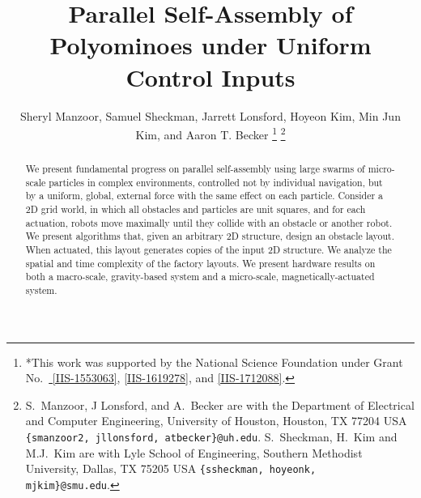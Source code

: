 \documentclass[letterpaper, 10 pt, conference]{ieeeconf}
\begin{document}
\title{\LARGE \bf 
Parallel Self-Assembly of Polyominoes under Uniform Control Inputs 
}
\author{Sheryl Manzoor, Samuel Sheckman, Jarrett Lonsford, Hoyeon Kim, Min Jun Kim, and Aaron T. Becker%
\thanks{*This work was supported by the National Science Foundation under Grant No.\ \href{http://nsf.gov/awardsearch/showAward?AWD_ID=1553063}{ [IIS-1553063]}, \href{http://nsf.gov/awardsearch/showAward?AWD_ID=1619278}{[IIS-1619278]}, and \href{https://nsf.gov/awardsearch/showAward?AWD_ID=1712088}{[IIS-1712088]}.}%
\thanks{S.~Manzoor, J Lonsford, and  A.~Becker are with the Department of Electrical and Computer Engineering,  University of Houston, Houston, TX 77204 USA        {\tt\small  \{smanzoor2, jllonsford, atbecker\}@uh.edu}. S.~Sheckman, H.~Kim and M.J.~Kim are with Lyle School of Engineering,   Southern Methodist University, Dallas, TX 75205 USA        {\tt\small  \{ssheckman, hoyeonk, mjkim\}@smu.edu}.%
}
}
\maketitle


\begin{abstract} 
We present fundamental progress on parallel self-assembly using large swarms of micro-scale particles in complex environments, controlled not by individual navigation, but by a uniform, global, external force with the same effect on each particle.
Consider a 2D grid world, in which all obstacles and particles are unit squares,
and for each actuation, robots move maximally until they collide with an obstacle or another robot. 
We present algorithms that, given an arbitrary 2D structure, design an obstacle layout.
 When actuated, this layout generates copies of the input 2D structure.
We analyze the spatial and time complexity of the factory layouts. 
We present hardware results on both a macro-scale, gravity-based system and a micro-scale, magnetically-actuated system.


\end{abstract}












\end{document}
